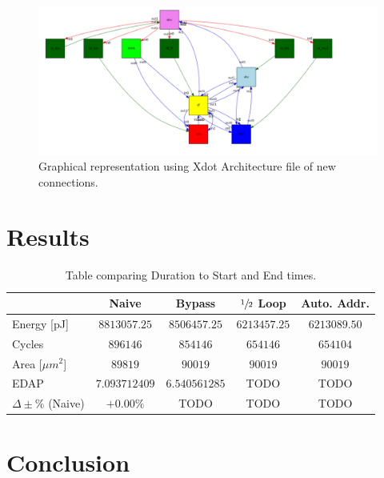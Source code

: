 \documentclass[letterpaper, 10 pt, conference]{ieeeconf}  %
\begin{document}
\begin{figure}[h]
\begin{center}
\includegraphics[scale=0.28]{images/arch.png}
\caption{Graphical representation using Xdot Architecture file of new connections.}
\label{fig:TODO2}
\end{center}
\end{figure}


\section{Results}

\begin{table}[h!]
\centering
\vspace{5pt}
\centering
\begin{tabular}{|l|c|c|c|c|}
\rowcolor[HTML]{C0C0C0}
\hline
 & Naive & Bypass & $\sfrac{1}{2}$ Loop & Auto. Addr. \\ \hline
Energy [pJ] & $8813057.25$  & $8506457.25$ & $6213457.25$ & $6213089.50$ \\ \hline
Cycles & $896146$ & $854146$ & $654146$ & $654104$ \\ \hline
Area [$\mu m^2$] & $89819$ & $90019$ & $90019$ & $90019$ \\ \hline
EDAP & $7.093712409$ & $6.540561285$ & TODO & TODO \\ \hline
$\Delta\pm\%$ (Naive) & $+0.00\%$ & TODO & TODO & TODO \\ \hline

\end{tabular}
\caption{Table comparing Duration to Start and End times.}
\label{tab:compare}
\end{table}

\section{Conclusion}
\end{document}
